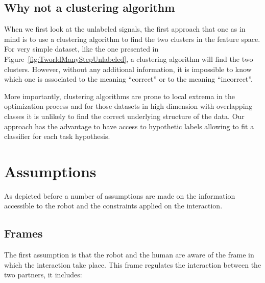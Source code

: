 
\subsection{Why not a clustering algorithm}
\label{chapter:lfui:whynotEM}

When we first look at the unlabeled signals, the first approach that one as in mind is to use a clustering algorithm to find the two clusters in the feature space. For very simple dataset, like the one presented in Figure~\ref{fig:TworldManyStepUnlabeled}, a clustering algorithm will find the two clusters. However, without any additional information, it is impossible to know which one is associated to the meaning ``correct'' or to the meaning ``incorrect''.

More importantly, clustering algorithms are prone to local extrema in the optimization process and for those datasets in high dimension with overlapping classes it is unlikely to find the correct underlying structure of the data. Our approach has the advantage to have access to hypothetic labels allowing to fit a classifier for each task hypothesis.

\section{Assumptions}
\label{chapter:lfui:assumptions}

As depicted before a number of assumptions are made on the information accessible to the robot and the constraints applied on the interaction.

\subsection{Frames}

The first assumption is that the robot and the human are aware of the frame in which the interaction take place. This frame regulates the interaction between the two partners, it includes:

